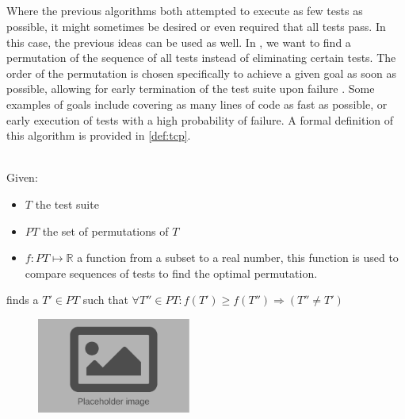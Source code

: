 
\subsection{\tcp{}}
Where the previous algorithms both attempted to execute as few tests as possible, it might sometimes be desired or even required that all tests pass. In this case, the previous ideas can be used as well. In \tcp{}, we want to find a permutation of the sequence of all tests instead of eliminating certain tests. The order of the permutation is chosen specifically to achieve a given goal as soon as possible, allowing for early termination of the test suite upon failure \cite{10.1002/stv.430}. Some examples of goals include covering as many lines of code as fast as possible, or early execution of tests with a high probability of failure. A formal definition of this algorithm is provided in \autoref{def:tcp}.

\begin{definition}[\tcp{}]
\label{def:tcp}
\mbox{}\\Given:
\begin{itemize}
	\item $T$ the test suite
	\item $PT$ the set of permutations of $T$
	\item $f: PT \mapsto \mathbb{R}$ a function from a subset to a real number, this function is used to compare sequences of tests to find the optimal permutation.
\end{itemize}

\noindent \tcp{} finds a $T' \in PT$ such that $\forall T'' \in PT : f(T') \ge f(T'') \Rightarrow (T'' \ne T')$ 
\end{definition}

\begin{figure}[htbp!]
	\centering
	\includegraphics[width=0.45\textwidth]{assets/placeholder.pdf}
	\caption{\tcp{}}
	\label{fig:tcp}
\end{figure}
